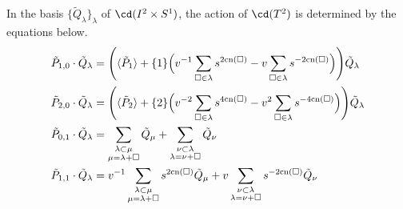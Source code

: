 \begin{proposition} \label{prop:generatoractions}
In the basis $\{ \tilde{Q}_\lambda \}_\lambda$ of $\cd(I^2 \times S^1)$, the action of $\cd(T^2)$ is determined by the equations below.
\begin{align}
    \tilde{P}_{1,0} \cdot \tilde{Q}_\lambda &= \Bigg(\langle \tilde{P}_1 \rangle + \{1\} \Big( v^{-1}\sum_{\square\in\lambda} s^{2\mathrm{cn}(\square)} - v \sum_{\square\in\lambda} s^{-2\mathrm{cn}(\square)} \Big) \Bigg) \tilde{Q}_\lambda \label{eq:1,0}\\
    \tilde{P}_{2,0} \cdot \tilde{Q}_\lambda &= \Bigg(\langle \tilde{P}_2 \rangle + \{2\} \Big( v^{-2}\sum_{\square\in\lambda} s^{4\mathrm{cn}(\square)} - v^2 \sum_{\square\in\lambda} s^{-4\mathrm{cn}(\square)} \Big) \Bigg) \tilde{Q}_\lambda \label{eq:2,0}\\
    \tilde{P}_{0,1} \cdot \tilde{Q}_\lambda &= \sum_{\substack{\lambda \subset \mu \\ \mu = \lambda + \square}} \tilde{Q}_\mu + \sum_{\substack{\nu \subset \lambda \\ \lambda = \nu + \square}} \tilde{Q}_\nu \label{eq:0,1}\\
    \tilde{P}_{1,1} \cdot \tilde{Q}_\lambda &= v^{-1} \sum_{\substack{\lambda \subset \mu \\ \mu = \lambda + \square}} s^{2\mathrm{cn}(\square)} \tilde{Q}_\mu + v \sum_{\substack{\nu \subset \lambda \\ \lambda = \nu + \square}} s^{-2\mathrm{cn}(\square)} \tilde{Q}_\nu \label{eq:1,1}
\end{align}
\end{proposition}
